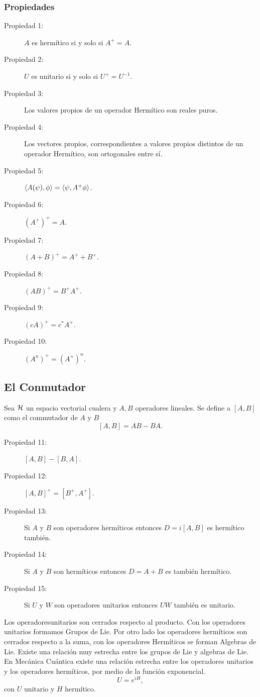 \subsubsection{Propiedades}
\begin{description}
	\item[Propiedad 1: ] $A$ es hermítico si y solo si $A^+ = A$.
	\item[Propiedad 2: ] $U$ es unitario si y solo si $U^+ = U^{-1}$.
	\item[Propiedad 3:] Los valores propios de un operador Hermítico son reales puros.
	\item[Propiedad 4: ] Los vectores propios, correspondientes a valores propios distintos de un operador Hermítico, son ortogonales entre sí.
	\item[Propiedad 5: ] $\langle A(\psi) , \phi \rangle = \langle \psi , A^+ \phi \rangle$.
	\item[Propiedad 6: ] $(A^+)^+ = A$.
	\item[Propiedad 7: ] $(A+B)^+ = A^+ + B^+$.
	\item[Propiedad 8: ] $(AB)^+ = B^+ A^+$.
	\item[Propiedad 9: ] $(cA)^+ = c^* A^+$.
	\item[Propiedad 10: ] $(A^n)^+ = (A^+)^n$.
\end{description}


\subsection{El Conmutador}
Sea $\mathcal{H}$ un espacio vectorial cualera y $A,B$ operadores lineales. Se define a $[A,B]$ como el commutador de $A$ y $B$
	$$ [A,B] = AB - BA. $$


\begin{description}
	\item[Propiedad 11: ] $[A,B] - [B,A]$.
	\item[Propiedad 12: ] $[A,B]^+ = [B^+,A^+]$.
	\item[Propiedad 13: ] Si $A$ y $B$ son operadores hermíticos entonces $D = i[A,B]$ es hermítico también.
	\item[Propiedad 14: ] Si $A$ y $B$ son hermíticos entonces $D = A + B$ es también hermítico.
	\item[Propiedad 15: ] Si $U$ y $W$ son operadores unitarios entonces $UW$ también es unitario.
\end{description}

Los operadoresunitarios son cerrados respecto al producto. Con los operadores unitarios formamos Grupos de Lie. Por otro lado los operadores hermíticos son cerrados respecto a la suma, con los operadores Hermíticos se forman Algebras de Lie. Existe una relación muy estrecha entre los grupos de Lie y algebras de Lie. En Mecánica Cuántica existe una relación estrecha entre los operadores unitarios y los operadores hermíticos, por medio de la función exponencial.
	$$ U = e^{iH}, $$
con $U$ unitario y $H$ hermítico.


